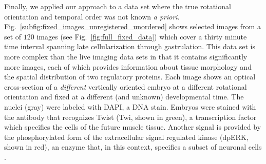 \documentclass[twocolumn, 10pt]{article}
\makeatletter
\newcommand{\SI}[0]{\textit{SI Materials and Methods}}
\newcommand{\fig}[0]{Fig.}
\newcommand{\customlabel}[2]{%
\protected@write \@auxout {}{\string \newlabel {#1}{{#2}{}}}}
\makeatother
\begin{document}
Finally, we applied our approach to a data set where the true rotational orientation and temporal order was not known {\it a priori}.
%
\fig~\ref{subfig:fixed_images_unregistered_unordered} shows selected images from a set of $120$ images (see \fig~\ref{fig:full_fixed_data}) which cover a thirty minute time interval spanning late cellularization through gastrulation.
%
This data set is more complex than the live imaging data sets in that it contains significantly more images, each of which provides information about tissue morphology and the spatial distribution of two regulatory proteins.
%
Each image shows an optical cross-section of a {\em different} vertically oriented embryo at a different rotational orientation and fixed at a different (and unknown) developmental time.
%
The nuclei (gray) were labeled with DAPI, a DNA stain.
%
Embryos were stained with the antibody that recognizes Twist (Twi, shown in green), a transcription factor which specifies the cells of the future muscle tissue.
%
Another signal is provided by the phosphorylated form of the extracellular signal regulated kinase (dpERK, shown in red), an enzyme that, in this context, specifies a subset of neuronal cells \citep{Lim2013kinetics}.

\end{document}
